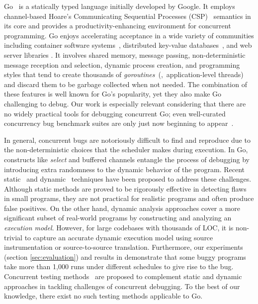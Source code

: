 Go~\cite{go} is a statically typed language initially developed by Google.
%
It employs channel-based Hoare's Communicating Sequential Processes (CSP)~\cite{hoare-csp78} semantics in its core and provides a productivity-enhancing environment for concurrent programming.
%
Go enjoys accelerating acceptance in a wide variety of
communities including container software systems~\cite{merkel2014docker,kubernetes},  distributed key-value databases~\cite{etcd,cockroachdb-sigmod20}, and web server libraries \cite{grpc}.
%
It involves shared memory, message passing, non-deterministic message reception and selection, dynamic process creation, and programming styles that tend to create thousands of \textit{goroutines}~(\ie,~application-level threads) and discard them to be garbage collected when not needed.
%
The combination of these features is well known for Go's popularity, yet they also make Go challenging to debug.
%
Our work is especially relevant considering that there are no widely practical tools for debugging concurrent Go; even well-curated
concurrency bug benchmark suites are only just now beginning to appear~\cite{tu-concurrentBugs-asplos19,yuan-gobench-cgo21}.
%

In general, concurrent bugs are notoriously difficult to find and reproduce due to the non-deterministic choices that the scheduler makes during execution.
%
In Go, constructs like \textit{select} and buffered channels entangle the process of debugging by introducing extra randomness to the dynamic behavior of the program.
%
Recent static~\cite{ng-dl-cc16,stadtmuller-minigo-aplas16,lange-fence-popl17,lange-staticType-icse18} and dynamic~\cite{go-race-blog,zhao-occam97,sulzmann-corr17,sulzmann-twophase-2018,dilley-gomela-corr2020} techniques have been proposed to address these challenges.
%
Although static methods are proved to be rigorously effective in detecting flaws in small programs, they are not practical for realistic programs and often produce false positives.
%
On the other hand, dynamic analysis approaches cover a more significant subset of real-world programs by constructing and analyzing an \textit{execution model}.
%
However, for large codebases with thousands of LOC, it is non-trivial to capture an accurate dynamic execution model using source instrumentation or source-to-source translation.
%
Furthermore, our experiments (section \ref{sec:evaluation}) and results in \cite{yuan-gobench-cgo21} demonstrate that some buggy programs take more than 1,000 runs under different schedules to give rise to the bug.
%
Concurrent testing methods~\cite{arora-concrrentTesting-16} are proposed to complement static and dynamic approaches in tackling challenges of concurrent debugging.
%
To the best of our knowledge, there exist no such testing methods applicable to Go.
%

